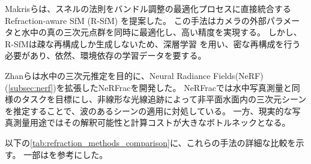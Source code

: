 Makrisら\cite{Makris2024_refractive-aware-sfm}は、スネルの法則をバンドル調整の最適化プロセスに直接統合するRefraction-aware SfM (R-SfM) を提案した。
この手法はカメラの外部パラメータと水中の真の三次元点群を同時に最適化し、高い精度を実現する。
しかし、R-SfMは疎な再構成しか生成しないため、深層学習 \cite{Alevizos2022_DL-shallow-bathymetry} を用い、密な再構成を行う必要があり、依然、環境依存の学習データを要する。

Zhanら\cite{Zhan2023CVPR_NeRFrac}は水中の三次元推定を目的に、Neural Radiance Fields(NeRF)(\cref{subsec:nerf})を拡張したNeRFracを開発した。
NeRFracでは水中写真測量と同様のタスクを目標にし、非線形な光線追跡によって非平面水面内の三次元シーンを推定することで、波のあるシーンの適用に対処している。
一方、現実的な写真測量用途ではその解釈可能性と計算コストが大きなボトルネックとなる。


以下の\cref{tab:refraction_methods_comparison}に、これらの手法の詳細な比較を示す。
一部は\cite{Kujawa2025_survey-shallow-bathymetry}を参考にした。





\newpage

\begingroup
\renewcommand{\arraystretch}{1.3} %
\small %

